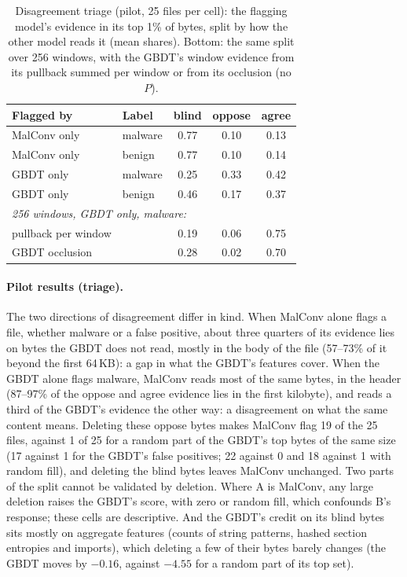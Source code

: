 \begin{table}[t]
  \centering
  \small
  \begin{tabular}{llccc}
    \toprule
    Flagged by & Label & blind & oppose & agree \\
    \midrule
    MalConv only & malware & 0.77 & 0.10 & 0.13 \\
    MalConv only & benign & 0.77 & 0.10 & 0.14 \\
    GBDT only & malware & 0.25 & 0.33 & 0.42 \\
    GBDT only & benign & 0.46 & 0.17 & 0.37 \\
    \midrule
    \multicolumn{5}{l}{\textit{256 windows, GBDT only, malware:}} \\
    \quad pullback per window & & 0.19 & 0.06 & 0.75 \\
    \quad GBDT occlusion & & 0.28 & 0.02 & 0.70 \\
    \bottomrule
  \end{tabular}
  \caption{Disagreement triage (pilot, 25 files per cell): the flagging model's evidence in its top 1\% of bytes, split by how the other model reads it (mean shares). Bottom: the same split over 256 windows, with the GBDT's window evidence from its pullback summed per window or from its occlusion (no $P$).}
  \label{tab:XML:Triage}
\end{table}

\paragraph{Pilot results (triage).} The two directions of disagreement differ in kind. When MalConv alone flags a file, whether malware or a false positive, about three quarters of its evidence lies on bytes the GBDT does not read, mostly in the body of the file (57--73\% of it beyond the first 64\,KB): a gap in what the GBDT's features cover. When the GBDT alone flags malware, MalConv reads most of the same bytes, in the header (87--97\% of the oppose and agree evidence lies in the first kilobyte), and reads a third of the GBDT's evidence the other way: a disagreement on what the same content means. Deleting these oppose bytes makes MalConv flag 19 of the 25 files, against 1 of 25 for a random part of the GBDT's top bytes of the same size (17 against 1 for the GBDT's false positives; 22 against 0 and 18 against 1 with random fill), and deleting the blind bytes leaves MalConv unchanged. Two parts of the split cannot be validated by deletion. Where A is MalConv, any large deletion raises the GBDT's score, with zero or random fill, which confounds B's response; these cells are descriptive. And the GBDT's credit on its blind bytes sits mostly on aggregate features (counts of string patterns, hashed section entropies and imports), which deleting a few of their bytes barely changes (the GBDT moves by $-0.16$, against $-4.55$ for a random part of its top set).


